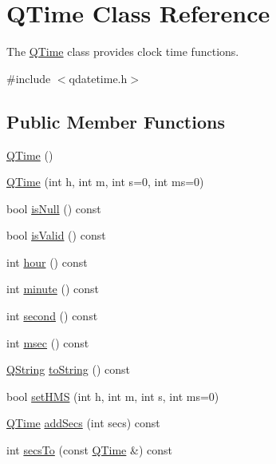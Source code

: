\hypertarget{class_q_time}{}\section{Q\+Time Class Reference}
\label{class_q_time}


The \mbox{\hyperlink{class_q_time}{Q\+Time}} class provides clock time functions.  




{\ttfamily \#include $<$qdatetime.\+h$>$}

\subsection*{Public Member Functions}
\begin{DoxyCompactItemize}
\item 
\mbox{\hyperlink{class_q_time_acf8e9864d7d793eda72d68481e9c2387}{Q\+Time}} ()
\item 
\mbox{\hyperlink{class_q_time_a02d9df9fff2be1e261ae9a4b60742f5f}{Q\+Time}} (int h, int m, int s=0, int ms=0)
\item 
bool \mbox{\hyperlink{class_q_time_a05bdf71ae9a3fd858f48cafd94f31240}{is\+Null}} () const
\item 
bool \mbox{\hyperlink{class_q_time_a4f54e1193a12519a7bd9efb7ea16fdca}{is\+Valid}} () const
\item 
int \mbox{\hyperlink{class_q_time_a228b4c7467705db31821dadd5ec9101b}{hour}} () const
\item 
int \mbox{\hyperlink{class_q_time_a229f09c7a639dc11990463d827fa5137}{minute}} () const
\item 
int \mbox{\hyperlink{class_q_time_ab313147e79b92a374963a0e238acb071}{second}} () const
\item 
int \mbox{\hyperlink{class_q_time_a88ab10ec33b877a15bb0d0c7971de90e}{msec}} () const
\item 
\mbox{\hyperlink{class_q_string}{Q\+String}} \mbox{\hyperlink{class_q_time_a87ef6af883b329327e1665cc639d403c}{to\+String}} () const
\item 
bool \mbox{\hyperlink{class_q_time_a9c52b0963595ba4acd9b5922a5beeb06}{set\+H\+MS}} (int h, int m, int s, int ms=0)
\item 
\mbox{\hyperlink{class_q_time}{Q\+Time}} \mbox{\hyperlink{class_q_time_ae5ba40307760c49c56896da08d69c363}{add\+Secs}} (int secs) const
\item 
int \mbox{\hyperlink{class_q_time_a8193498cc40d7386b23df740fa326b2b}{secs\+To}} (const \mbox{\hyperlink{class_q_time}{Q\+Time}} \&) const

\end{DoxyCompactItemize}
